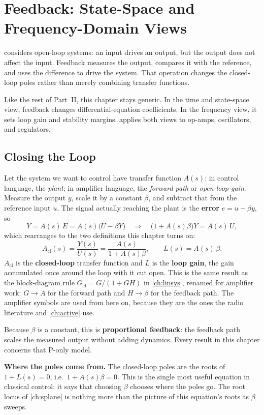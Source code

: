 \chapter{Feedback: State-Space and Frequency-Domain Views}
\label{ch:feedback}
 considers open-loop systems: an input drives an
output, but the output does not affect the input. Feedback measures the output,
compares it with the reference, and uses the difference to drive the system. That
operation changes the closed-loop poles rather than merely combining transfer
functions.

Like the rest of Part~II, this chapter stays generic. In the time and state-space
view, feedback changes differential-equation coefficients. In the frequency view,
it sets loop gain and stability margins.  applies both views to
op-amps, oscillators, and regulators.

\section{Closing the Loop}
Let the system we want to control have transfer function \(A(s)\): in control
language, the \emph{plant}; in amplifier language, the \emph{forward path} or
\emph{open-loop gain}. Measure the output \(y\), scale it by a constant \(\beta\),
and subtract that from the reference input \(u\). The signal actually reaching the
plant is the \textbf{error} \(e=u-\beta y\), so
\[
Y=A(s)\,E=A(s)\bigl(U-\beta Y\bigr)
\quad\Longrightarrow\quad
\bigl(1+A(s)\beta\bigr)Y=A(s)\,U,
\]
which rearranges to the two definitions this chapter turns on:
\[
\boxed{\;
A_{\mathrm{cl}}(s)=\frac{Y(s)}{U(s)}=\frac{A(s)}{1+A(s)\beta},
\qquad
L(s)=A(s)\,\beta .\;}
\]
\(A_{\mathrm{cl}}\) is the \textbf{closed-loop} transfer function and \(L\) is the
\textbf{loop gain}, the gain accumulated once around the loop with it cut open.
This is the same result as the block-diagram rule \(G_{\mathrm{cl}}=G/(1+GH)\) in
\cref{ch:linsys}, renamed for amplifier work: \(G\to A\) for the forward path and
\(H\to\beta\) for the feedback path. The amplifier symbols are used from here on,
because they are the ones the radio literature and \cref{ch:active} use.
\cite[pp.~19--28, 45]{leigh2012control}

Because \(\beta\) is a constant, this is \textbf{proportional feedback}: the
feedback path scales the measured output without adding dynamics. Every result in
this chapter concerns that P-only model.

\begin{controlsbox}
\textbf{Where the poles come from.} The closed-loop poles are the roots of
\(1+L(s)=0\), i.e.\ \(1+A(s)\beta=0\). This is the single most useful equation in
classical control: it says that choosing \(\beta\) chooses where the poles go. The
root locus of \cref{ch:splane} is nothing more than the picture of this equation's
roots as \(\beta\) sweeps.
\end{controlsbox}

